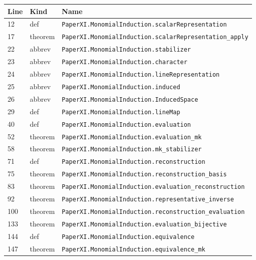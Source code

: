 \documentclass[10pt,oneside]{book}
\begin{document}
\begin{longtable}{@{}p{}p{}p{}@{}}\toprule Line&Kind&Name\\\midrule\endhead

12&def&\nolinkurl{PaperXI.MonomialInduction.scalarRepresentation}\\

17&theorem&\nolinkurl{PaperXI.MonomialInduction.scalarRepresentation_apply}\\

22&abbrev&\nolinkurl{PaperXI.MonomialInduction.stabilizer}\\

23&abbrev&\nolinkurl{PaperXI.MonomialInduction.character}\\

24&abbrev&\nolinkurl{PaperXI.MonomialInduction.lineRepresentation}\\

25&abbrev&\nolinkurl{PaperXI.MonomialInduction.induced}\\

26&abbrev&\nolinkurl{PaperXI.MonomialInduction.InducedSpace}\\

29&def&\nolinkurl{PaperXI.MonomialInduction.lineMap}\\

40&def&\nolinkurl{PaperXI.MonomialInduction.evaluation}\\

52&theorem&\nolinkurl{PaperXI.MonomialInduction.evaluation_mk}\\

58&theorem&\nolinkurl{PaperXI.MonomialInduction.mk_stabilizer}\\

71&def&\nolinkurl{PaperXI.MonomialInduction.reconstruction}\\

75&theorem&\nolinkurl{PaperXI.MonomialInduction.reconstruction_basis}\\

83&theorem&\nolinkurl{PaperXI.MonomialInduction.evaluation_reconstruction}\\

92&theorem&\nolinkurl{PaperXI.MonomialInduction.representative_inverse}\\

100&theorem&\nolinkurl{PaperXI.MonomialInduction.reconstruction_evaluation}\\

133&theorem&\nolinkurl{PaperXI.MonomialInduction.evaluation_bijective}\\

144&def&\nolinkurl{PaperXI.MonomialInduction.equivalence}\\

147&theorem&\nolinkurl{PaperXI.MonomialInduction.equivalence_mk}\\

\bottomrule\end{longtable}
\end{document}
